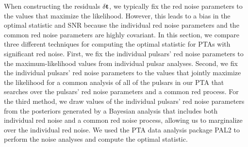 \documentclass[twocolumn,aps,prd,superscriptaddress]{revtex4-1}
\newcommand{\res}{\ensuremath{\delta {\bf t}}}
\begin{document}
When constructing the residuals $\res$, 
we typically fix the red noise parameters to the values that 
maximize the likelihood. 
However, this leads to a bias in the optimal statistic and SNR because 
the individual red noise parameters and the common red noise parameters 
are highly covariant. 
In this section, we compare three different techniques for computing the 
optimal statistic for PTAs with significant red noise. 
First, we fix the individual pulsars' red noise parameters to the 
maximum-likelihood values from individual pulsar analyses. 
Second, we fix the individual pulsars' red noise parameters to the 
values that jointly maximize the likelihood for a common analysis 
of all of the pulsars in our PTA 
that searches over the pulsars' red noise parameters and 
a common red process. 
For the third method, we draw values of the individual pulsars' 
red noise parameters from the posteriors generated by a Bayesian analysis 
that includes both individual red noise and a common red noise process, 
allowing us to marginalize over the individual red noise. 
We used the PTA data analysis package 
PAL2 %
\citep{evh17a}
to perform the noise analyses and compute the optimal statistic.
\end{document}
